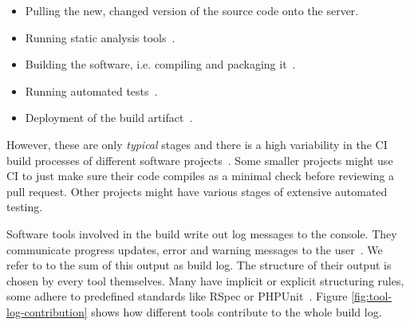 \documentclass[\myrootdir/main.tex]{subfiles}
\begin{document}
\begin{itemize}
	\item Pulling the new, changed version of the source code onto the server.
	\item Running static analysis tools~\cite{zampetti2017open}.
	\item Building the software, i.e. compiling and packaging it~\cite{phillips2014understanding}.
	\item Running automated tests~\cite{beller2017oops}.
	\item Deployment of the build artifact~\cite{schermann2016empirical}.
\end{itemize}

However, these are only \emph{typical} stages and there is a high variability in the CI build processes of different software projects~\cite{staahl2014modeling}.
Some smaller projects might use CI to just make sure their code compiles as a minimal check before reviewing a pull request.
Other projects might have various stages of extensive automated testing.

Software tools involved in the build write out log messages to the console.
They communicate progress updates, error and warning messages to the user~\cite{yuan2012characterizing}.
We refer to to the sum of this output as build log.
The structure of their output is chosen by every tool themselves.
Many have implicit or explicit structuring rules, some adhere to predefined standards like RSpec or PHPUnit~\cite{phpunit2019logging,rspec2019format}.
Figure \ref{fig:tool-log-contribution} shows how different tools contribute to the whole build log.
\end{document}
